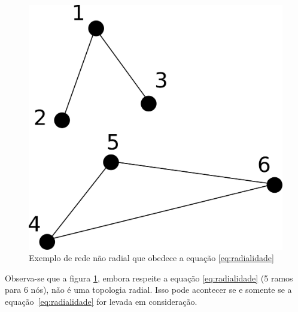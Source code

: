 \begin{figure}[H]
    \centering
    \includegraphics[scale = 1]{4_Modeling/restricao_fail.png}
    \caption{Exemplo de rede não radial que obedece a equação \ref{eq:radialidade}}
    \label{fig:radialidade_wrong}
\end{figure}

Observa-se que a figura \ref{fig:radialidade_wrong}, embora respeite a equação \ref{eq:radialidade} (5 ramos para 6 nós), não é uma topologia radial. Isso pode acontecer se e somente se a equação~\ref{eq:radialidade} for levada em consideração.

